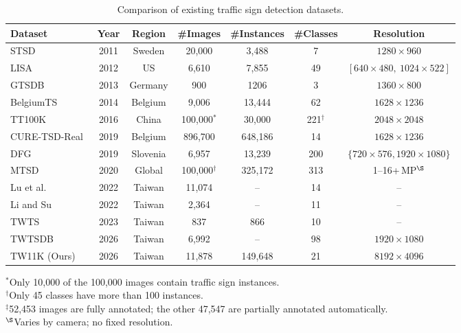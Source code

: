 \documentclass[runningheads]{llncs}
\begin{document}
\begin{table}[t]
    \centering
    \caption{Comparison of existing traffic sign detection datasets.}
    \label{tab:datasets}
    \setlength{\tabcolsep}{1pt}
    \begin{tabular}{lcccccc}
    \hline
    Dataset & Year & Region & \#Images & \#Instances & \#Classes & Resolution \\
    \hline
    STSD~\cite{larsson2011using} & 2011 & Sweden & 20,000 & 3,488 & 7 & $1280\times960$ \\
    LISA~\cite{mogelmose2012vision} & 2012 & US & 6,610 & 7,855 & 49 & $[640\times480,\ 1024\times522]$ \\
    GTSDB~\cite{houben2013detection} & 2013 & Germany & 900 & 1206 & 3 & $1360\times800$ \\
    BelgiumTS~\cite{timofte2014multi} & 2014 & Belgium & 9,006 & 13,444 & 62 & $1628\times1236$ \\
    TT100K~\cite{zhu2016traffic} & 2016 & China & 100,000$^{*}$ & 30,000 & 221$^{\dagger}$ & $2048\times2048$ \\
    CURE-TSD-Real~\cite{temel2019traffic} & 2019 & Belgium & 896,700 & 648,186 & 14 & $1628\times1236$ \\
    DFG~\cite{tabernik2019deep} & 2019 & Slovenia & 6,957 & 13,239 & 200 & $\{720\times576,1920\times1080\}$ \\
    MTSD~\cite{ertler2020mapillary} & 2020 & Global & 100,000$^{\dagger}$ & 325,172 & 313 & 1--16+\,MP$^{\S}$ \\
    Lu et al.~\cite{lu2022hierarchical} & 2022 & Taiwan & 11,074 & -- & 14 & -- \\
    Li and Su~\cite{li2022traffic} & 2022 & Taiwan & 2,364 & -- & 11 & -- \\
    TWTS~\cite{suwattanapunkul2023efficient} & 2023 & Taiwan & 837 & 866 & 10 & -- \\
    TWTSDB~\cite{lin2026csformer} & 2026 & Taiwan & 6,992 & -- & 98 & $1920\times1080$ \\
    \hline
    TW11K (Ours) & 2026 & Taiwan & 11,878 & 149,648 & 21 & $8192\times4096$ \\
    \hline
    \end{tabular}

    \vspace{5pt}
    \begin{minipage}{\linewidth}
        \raggedright
        \footnotesize $^{*}$Only 10,000 of the 100,000 images contain traffic sign instances.\\
        \footnotesize $^{\dagger}$Only 45 classes have more than 100 instances.\\
        \footnotesize $^{\ddagger}$52,453 images are fully annotated; the other 47,547 are partially annotated automatically.\\
        \footnotesize $^{\S}$Varies by camera; no fixed resolution.
    \end{minipage}
\end{table}
\end{document}
